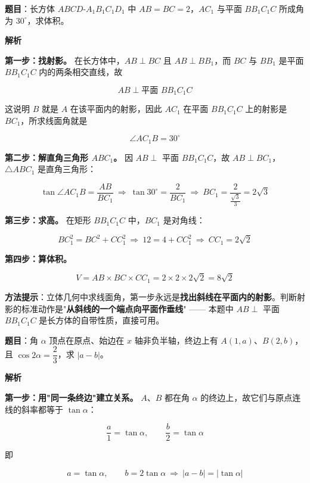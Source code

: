 
\textbf{题目}：长方体 $ABCD\text{-}A_1B_1C_1D_1$ 中 $AB=BC=2$，$AC_1$ 与平面 $BB_1C_1C$ 所成角为 $30^\circ$，求体积。

\textbf{解析}

\textbf{第一步：找射影。} 在长方体中，$AB\perp BC$ 且 $AB\perp BB_1$，而 $BC$ 与 $BB_1$ 是平面 $BB_1C_1C$ 内的两条相交直线，故

\[AB\perp\text{平面 }BB_1C_1C\]

这说明 $B$ 就是 $A$ 在该平面内的射影，因此 $AC_1$ 在平面 $BB_1C_1C$ 上的射影是 $BC_1$，所求线面角就是

\[\angle AC_1B=30^\circ\]

\textbf{第二步：解直角三角形 $ABC_1$。} 因 $AB\perp$ 平面 $BB_1C_1C$，故 $AB\perp BC_1$，$\triangle ABC_1$ 是直角三角形：

\[\tan\angle AC_1B=\frac{AB}{BC_1}\ \Longrightarrow\ \tan30^\circ=\frac2{BC_1}\ \Longrightarrow\ BC_1=\frac2{\frac{\sqrt3}3}=2\sqrt3\]

\textbf{第三步：求高。} 在矩形 $BB_1C_1C$ 中，$BC_1$ 是对角线：

\[BC_1^{2}=BC^{2}+CC_1^{2}\ \Longrightarrow\ 12=4+CC_1^{2}\ \Longrightarrow\ CC_1=2\sqrt2\]

\textbf{第四步：算体积。}

\[V=AB\times BC\times CC_1=2\times2\times2\sqrt2=8\sqrt2\]


\begin{gktip}
\textbf{方法提示}：立体几何中求线面角，第一步永远是\textbf{找出斜线在平面内的射影}。判断射影的标准动作是"\textbf{从斜线的一个端点向平面作垂线}" —— 本题中 $AB\perp$ 平面 $BB_1C_1C$ 是长方体的自带性质，直接可用。
\end{gktip}

\par\medskip


\textbf{题目}：角 $\alpha$ 顶点在原点、始边在 $x$ 轴非负半轴，终边上有 $A(1,a)$、$B(2,b)$，且 $\cos2\alpha=\dfrac23$，求 $|a-b|$。

\textbf{解析}

\textbf{第一步：用"同一条终边"建立关系。} $A$、$B$ 都在角 $\alpha$ 的终边上，故它们与原点连线的斜率都等于 $\tan\alpha$：

\[\frac a1=\tan\alpha,\qquad \frac b2=\tan\alpha\]

即

\[a=\tan\alpha,\qquad b=2\tan\alpha\ \Longrightarrow\ |a-b|=|\tan\alpha|\]


